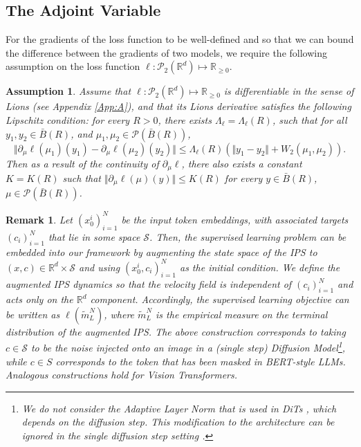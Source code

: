 \documentclass{article}
\newtheorem{remark}[theorem]{Remark}
\newtheorem{assumption}{Assumption}
\newcommand{\R}{\mathbb{R}}
\begin{document}
\subsection{The Adjoint Variable}\label{sec:adjoint}
 For the gradients of the loss function to be well-defined and so that we can bound the difference between the gradients of two models, we require the following assumption on the loss function  $\ell: \mathcal P_2(\R^d)\mapsto \R_{\ge 0}$.
\begin{assumption}\label{assm:Obj}
    Assume that $\ell: \mathcal P_2(\R^d)\mapsto \R_{\ge 0}$ is differentiable in the sense of Lions (see Appendix \ref{App:A}), and that its Lions derivative satisfies the following Lipschitz condition: for every $R>0$, there exists $\Lambda_\ell=\Lambda_\ell(R)$, such that for all $y_1,y_2\in \bar B(R)$, and $\mu_1,\mu_2\in \mathcal P(\bar B(R))$,    \[
    \Vert \partial_\mu \ell(\mu_1)(y_1)-  \partial_\mu \ell(\mu_2)(y_2)\Vert \le \Lambda_\ell(R)\left( \Vert y_1-y_2\Vert + W_2(\mu_1,\mu_2)\right).
    \]
    Then as a result of the continuity of $\partial_\mu\ell$, there also exists a constant $K=K(R)$ such that $\Vert \partial_\mu\ell(\mu)(y)\Vert \le K(R)$ for every $y\in \bar B(R)$, $\mu \in \mathcal P(\bar B(R))$.
\end{assumption}
\begin{remark}
    Let $(x^i_0)_{i=1}^N$ be the input token embeddings, with associated targets $(c_i)_{i=1}^N$ that lie in some space $\mathcal S$. Then, the supervised learning problem can be embedded into our framework by augmenting the state space of the IPS to $(x,c)\in \R^d\times \mathcal S$ and using $(x^i_0,c_i)_{i=1}^N$ as the initial condition. We define the augmented IPS dynamics so that the velocity field is independent of $(c_i)_{i=1}^N$ and acts only on the $\R^d$ component. Accordingly, the supervised learning objective can be written as  $\ell(\widetilde{m}^N_L)$, where $\widetilde{m}^N_L$ is the empirical measure on the terminal distribution of the augmented IPS. The above construction corresponds to taking $c\in \mathcal S$ to be the noise injected onto an image in a (single step) Diffusion Model\footnote{We do not consider the Adaptive Layer Norm that is used in DiTs \cite{peebles2023scalable}, which depends on the diffusion step. This modification to the architecture can be ignored in the single diffusion step setting \cite{SSDMs}.},  while $c\in S$ corresponds to the token that has been masked in BERT-style LLMs. Analogous constructions hold for Vision Transformers.
\end{remark}
\end{document}
